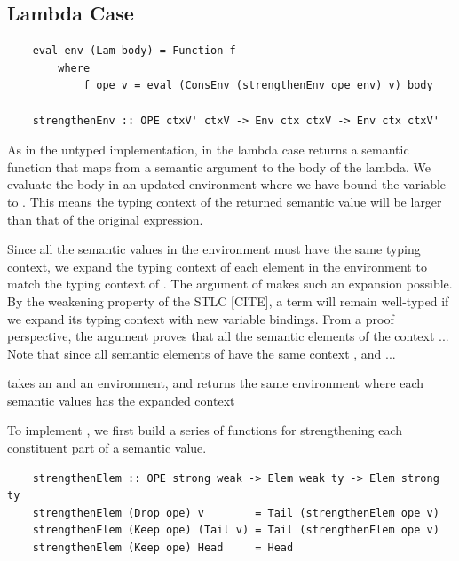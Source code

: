 
\subsection{Lambda Case}

\begin{lstlisting}
    eval env (Lam body) = Function f 
        where
            f ope v = eval (ConsEnv (strengthenEnv ope env) v) body

    strengthenEnv :: OPE ctxV' ctxV -> Env ctx ctxV -> Env ctx ctxV'
\end{lstlisting}

As in the untyped implementation, in the lambda case  returns a semantic function that maps from a semantic argument  to the body of the lambda. We evaluate the body in an updated environment where we have bound the variable  to . This means the typing context of the returned semantic value will be larger than that of the original expression.


Since all the semantic values in the environment must have the same typing context, we expand the typing context of each element in the environment to match the typing context  of . The  argument of  makes such an expansion possible. By the weakening property of the STLC [CITE], a term will remain well-typed if we expand its typing context with new variable bindings. From a proof perspective, the  argument proves that all the semantic elements of the context  ... 
Note that since all semantic elements of  have the same context , and  ...


 takes an  and an environment, and returns the same environment where each semantic values has the expanded context 

To implement , we first build a series of functions for strengthening each constituent part of a semantic value.

\begin{lstlisting}
    strengthenElem :: OPE strong weak -> Elem weak ty -> Elem strong ty
    strengthenElem (Drop ope) v        = Tail (strengthenElem ope v)
    strengthenElem (Keep ope) (Tail v) = Tail (strengthenElem ope v)
    strengthenElem (Keep ope) Head     = Head
\end{lstlisting}

